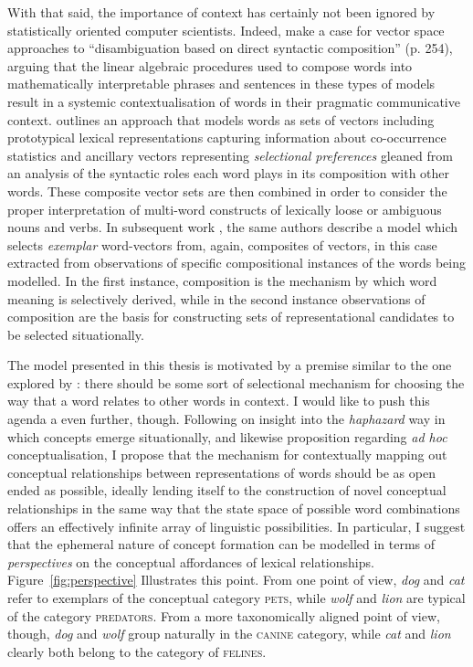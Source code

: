 With that said, the importance of context has certainly not been ignored by statistically oriented computer scientists.  Indeed, \cite{BaroniEA2014b} make a case for vector space approaches to ``disambiguation based on direct syntactic composition'' (p. 254), arguing that the linear algebraic procedures used to compose words into mathematically interpretable phrases and sentences in these types of models result in a systemic contextualisation of words in their pragmatic communicative context.  \cite{ErkEA2008} outlines an approach that models words as sets of vectors including prototypical lexical representations capturing information about co-occurrence statistics and ancillary vectors representing \emph{selectional preferences} \citep[\emph{a la}][]{Wilks1978} gleaned from an analysis of the syntactic roles each word plays in its composition with other words.  These composite vector sets are then combined in order to consider the proper interpretation of multi-word constructs of lexically loose or ambiguous nouns and verbs.  In subsequent work \citep{ErkEA2010}, the same authors describe a model which selects \emph{exemplar} word-vectors from, again, composites of vectors, in this case extracted from observations of specific compositional instances of the words being modelled.  In the first instance, composition is the mechanism by which word meaning is selectively derived, while in the second instance observations of composition are the basis for constructing sets of representational candidates to be selected situationally.

The model presented in this thesis is motivated by a premise similar to the one explored by \citeauthor{ErkEA2008}: there should be some sort of selectional mechanism for choosing the way that a word relates to other words in context.  I would like to push this agenda a even further, though.  Following on  insight into the \emph{haphazard} way in which concepts emerge situationally, and likewise  proposition regarding \emph{ad hoc} conceptualisation, I propose that the mechanism for contextually mapping out conceptual relationships between representations of words should be as open ended as possible, ideally lending itself to the construction of novel conceptual relationships in the same way that the state space of possible word combinations offers an effectively infinite array of linguistic possibilities.  In particular, I suggest that the ephemeral nature of concept formation can be modelled in terms of \emph{perspectives} on the conceptual affordances of lexical relationships.  Figure~\ref{fig:perspective} Illustrates this point.  From one point of view, \emph{dog} and \emph{cat} refer to exemplars of the conceptual category \textsc{pets}, while \emph{wolf} and \emph{lion} are typical of the category \textsc{predators}.  From a more taxonomically aligned point of view, though, \emph{dog} and \emph{wolf} group naturally in the \textsc{canine} category, while \emph{cat} and \emph{lion} clearly both belong to the category of \textsc{felines}.

